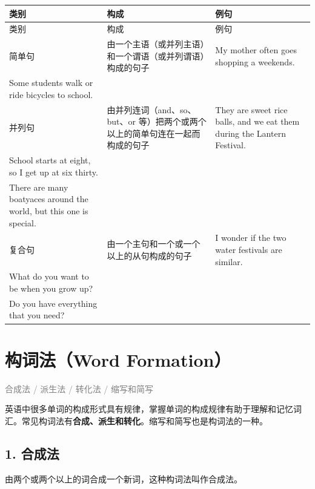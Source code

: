 \documentclass[11pt,a4paper]{ctexart}
\begin{document}
{\footnotesize
\begin{longtable}{p{4.47cm}p{4.47cm}p{4.47cm}}
\hline
类别 & 构成 & 例句 \\
\hline
\endfirsthead
\hline
类别 & 构成 & 例句 \\
\hline
\endhead
\hline
\endfoot
简单句 & 由一个主语（或并列主语）和一个谓语（或并列谓语）构成的句子 & My mother often goes shopping a weekends.\\ Some students walk or ride bicycles to school. \\
并列句 & 由并列连词（and、so、but、or 等）把两个或两个以上的简单句连在一起而构成的句子 & They are sweet rice balls, and we eat them during the Lantern Festival.\\ School starts at eight, so I get up at six thirty.\\ There are many boatyaces around the world, but this one is special. \\
复合句 & 由一个主句和一个或一个以上的从句构成的句子 & I wonder if the two water festivals are similar.\\ What do you want to be when you grow up?\\ Do you have everything that you need? \\
\end{longtable}
}

\begin{center}\end{center}

\section{构词法（Word Formation）}
\noindent\textcolor{gray}{合成法 / 派生法 / 转化法 / 缩写和简写}\par\smallskip
英语中很多单词的构成形式具有规律，掌握单词的构成规律有助于理解和记忆词汇。常见构词法有\textbf{合成、派生和转化}。缩写和简写也是构词法的一种。

\subsection*{1. 合成法}

由两个或两个以上的词合成一个新词，这种构词法叫作合成法。
\end{document}
